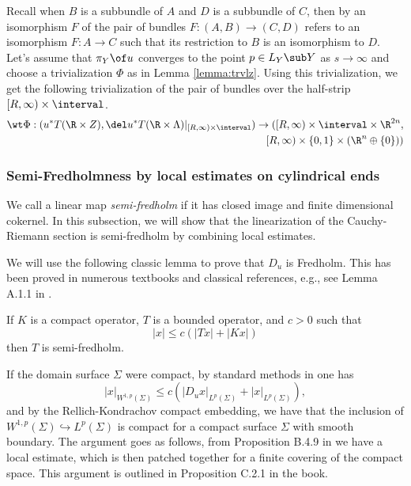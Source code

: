 \noindent  Recall when $B$ is a subbundle of $A$ and $D$ is a subbundle of $C$, then by an isomorphism $F$ of the pair of bundles $F: (A,B) \to (C,D)$ refers to an isomorphism $F:A\to C$ such that its restriction to $B$ is an isomorphism to $D$.  Let's assume that $\pi_Y \of u$ converges to the point $p \in L_Y \sub Y$ as $s\to \infty$ and choose a trivialization $\Phi$ as in Lemma \ref{lemma:trvlz}. Using this trivialization, we get the following trivialization of the pair of bundles over the half-strip $[R,\infty)\times \interval$.
\begin{align} \label{eq:pullbacktriv}
    \wt \Phi : (u^*T(\R \times Z), \del u^* T(\R \times \Lambda)|_{[R,\infty)\times \interval}) \to ([R,\infty)\times \interval \times \R^{2n} ,\\ [R,\infty)\times \{0,1\} \times (\R^n \oplus \{0\}) ) \nonumber
\end{align}






\subsubsection{Semi-Fredholmness by local estimates on cylindrical ends}\label{subsec:semifred}

We call a linear map \textit{semi-fredholm} if it has closed image and finite dimensional cokernel. In this subsection, we will show that the linearization of the Cauchy-Riemann section is semi-fredholm by combining local estimates.

We will use the following classic lemma to prove that $D_u$ is Fredholm. This has been proved in numerous textbooks and classical references, e.g., see Lemma A.1.1 in \cite{jholobook}. 
\begin{lemma}\label{semilemma}
If $K$ is a compact operator, $T$ is a bounded operator, and $c>0$ such that $$|x| \leq c(|Tx| + |Kx|)$$ then $T$ is semi-fredholm.
\end{lemma}


\noindent If  the domain surface $\Sigma$  were compact, by standard methods in \cite{jholobook} one has  $$|x|_{W^{1,p}(\Sigma)}\leq c(|D_ux|_{L^p(\Sigma)} + |x|_{L^p(\Sigma)}),$$ and by the Rellich-Kondrachov compact embedding, we have that the inclusion of $W^{1,p} (\Sigma) \hookrightarrow L^p (\Sigma)$ is compact for a compact surface $\Sigma$ with smooth boundary. The argument goes as follows, from Proposition B.4.9 in \cite{jholobook} we have a local estimate, which is then patched together for a finite covering of the compact space. This argument is outlined in Proposition C.2.1 in the book.

